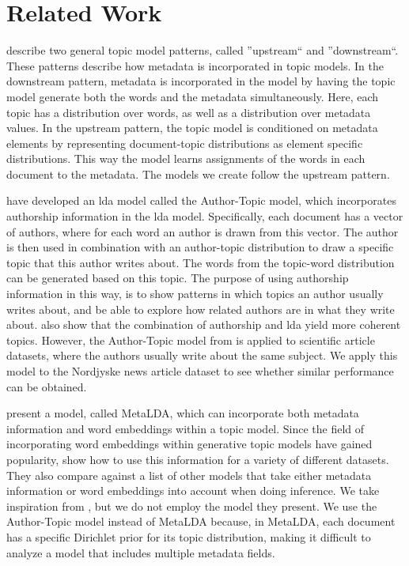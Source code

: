 \section{Related Work}\label{sec:related_work}
\citet{mimno2008topic} describe two general topic model patterns, called ''upstream`` and ''downstream``.
These patterns describe how metadata is incorporated in topic models.
In the downstream pattern, metadata is incorporated in the model by having the topic model generate both the words and the metadata simultaneously.
Here, each topic has a distribution over words, as well as a distribution over metadata values.
In the upstream pattern, the topic model is conditioned on metadata elements by representing document-topic distributions as element specific distributions.
This way the model learns assignments of the words in each document to the metadata.
The models we create follow the upstream pattern.

\citet{author_topic_2012} have developed an \gls{lda} model called the Author-Topic model, which incorporates authorship information in the \gls{lda} model.
Specifically, each document has a vector of authors, where for each word an author is drawn from this vector.
The author is then used in combination with an author-topic distribution to draw a specific topic that this author writes about.
The words from the topic-word distribution can be generated based on this topic.
The purpose of using authorship information in this way, is to show patterns in which topics an author usually writes about, and be able to explore how related authors are in what they write about.
\citeauthor{author_topic_2012} also show that the combination of authorship and \gls{lda} yield more coherent topics.
However, the Author-Topic model from \citet{author_topic_2012} is applied to scientific article datasets, where the authors usually write about the same subject.
We apply this model to the Nordjyske news article dataset to see whether similar performance can be obtained.

\citet{MetaLDA2017} present a model, called MetaLDA, which can incorporate both metadata information and word embeddings within a topic model.
Since the field of incorporating word embeddings within generative topic models have gained popularity\cite{dieng2020topic}, \citet{MetaLDA2017} show how to use this information for a variety of different datasets.
They also compare against a list of other models that take either metadata information or word embeddings into account when doing inference.
We take inspiration from \citet{MetaLDA2017}, but we do not employ the model they present. 
We use the Author-Topic model instead of MetaLDA because, in MetaLDA, each document has a specific Dirichlet prior for its topic distribution, making it difficult to analyze a model that includes multiple metadata fields.


